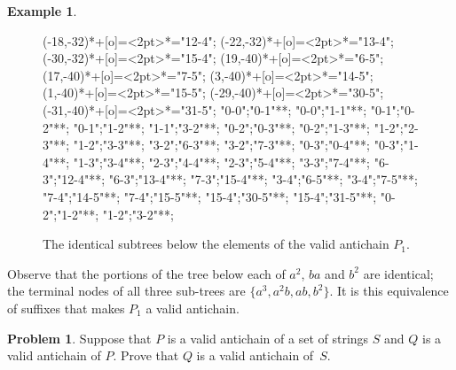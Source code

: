 \documentclass[12pt]{amsart}
\theoremstyle{definition}
\newtheorem{problem}{Problem}
\newtheorem{example}{Example}
\begin{document}
\begin{example}
\begin{figure}[H]
{(-18,-32)*+[o]=<2pt>\hbox{\textbullet}*="12-4";
(-22,-32)*+[o]=<2pt>\hbox{\textbullet}*="13-4";
(-30,-32)*+[o]=<2pt>\hbox{}*="15-4";
(19,-40)*+[o]=<2pt>\hbox{\textbullet}*="6-5";
(17,-40)*+[o]=<2pt>\hbox{\textbullet}*="7-5";
(3,-40)*+[o]=<2pt>\hbox{\textbullet}*="14-5";
(1,-40)*+[o]=<2pt>\hbox{\textbullet}*="15-5";
(-29,-40)*+[o]=<2pt>\hbox{\textbullet}*="30-5";
(-31,-40)*+[o]=<2pt>\hbox{\textbullet}*="31-5";
"0-0";"0-1"**;
"0-0";"1-1"**;
"0-1";"0-2"**;
"0-1";"1-2"**;
"1-1";"3-2"**;
"0-2";"0-3"**\dir{-};
"0-2";"1-3"**\dir{-};
"1-2";"2-3"**\dir{-};
"1-2";"3-3"**\dir{-};
"3-2";"6-3"**\dir{-};
"3-2";"7-3"**\dir{-};
"0-3";"0-4"**\dir{-};
"0-3";"1-4"**\dir{-};
"1-3";"3-4"**\dir{-};
"2-3";"4-4"**\dir{-};
"2-3";"5-4"**\dir{-};
"3-3";"7-4"**\dir{-};
"6-3";"12-4"**\dir{-};
"6-3";"13-4"**\dir{-};
"7-3";"15-4"**\dir{-};
"3-4";"6-5"**\dir{-};
"3-4";"7-5"**\dir{-};
"7-4";"14-5"**\dir{-};
"7-4";"15-5"**\dir{-};
"15-4";"30-5"**\dir{-};
"15-4";"31-5"**\dir{-};
%
"0-2";"1-2"**\dir{--};
"1-2";"3-2"**\dir{--};
%
%
%
%
%
\endxy
}
\caption{The identical subtrees below the elements of the valid antichain $P_1$.}
\end{figure}
%
%
%
%
Observe that the portions of the tree below each of $a^2$, $ba$ and $b^2$ are identical; the terminal nodes of all three sub-trees are $\{ a^3,a^2b,ab,b^2 \}$.  It is this equivalence of suffixes that makes $P_1$ a valid antichain.
\end{example}




\begin{problem}
Suppose that $P$ is a valid antichain of a set of strings $S$ and $Q$ is a valid antichain of $P$.  Prove that $Q$ is a valid antichain of~$S$.
\end{problem}
\end{document}
